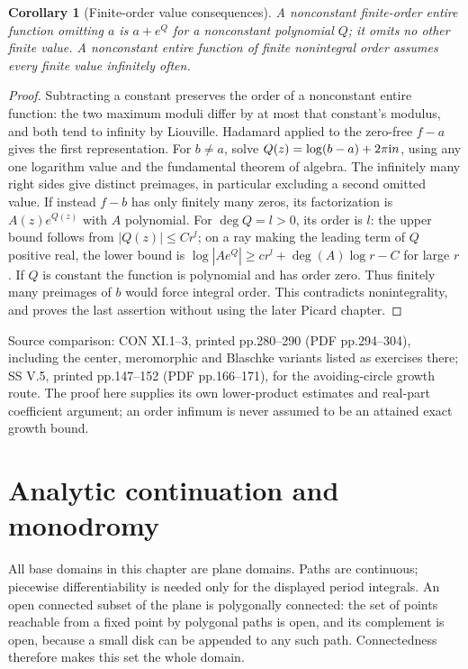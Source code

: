 \documentclass[11pt,a4paper,openany]{book}
\newtheorem{corollary}[theorem]{Corollary}
\theoremstyle{definition}
\theoremstyle{remark}\newtheorem{remark}[theorem]{Remark}
\newcommand{\family}[1]{}
\newcommand{\source}[1]{\par\begingroup\small\sffamily\color{black!65}Source comparison: #1\par\endgroup}
\begin{document}
\begin{corollary}[Finite-order value consequences]\label{d12:17-07}\family{D12.17.07}
A nonconstant finite-order entire function omitting $a$ is
$a+e^{Q}$ for a nonconstant polynomial $Q$; it omits no other finite
value. A nonconstant entire function of finite nonintegral order assumes
every finite value infinitely often.
\end{corollary}
\begin{proof}
Subtracting a constant preserves the order of a nonconstant entire
function: the two maximum moduli differ by at most that constant's
modulus, and both tend to infinity by Liouville. Hadamard applied to
the zero-free $f-a$ gives the first representation. For $b\ne a$, solve
$Q(z)=\log(b-a)+2\pi\mathrm i n$, using any one logarithm value and the
fundamental theorem of algebra. The infinitely many right sides give
distinct preimages, in particular excluding a second omitted value.
If instead $f-b$ has only finitely many zeros, its factorization is
$A(z)e^{Q(z)}$ with $A$ polynomial. For $\deg Q=l>0$, its order is
$l$: the upper bound follows from $|Q(z)|\le Cr^l$; on a ray making
the leading term of $Q$ positive real, the lower bound is
$\log|Ae^Q|\ge c r^l+\deg(A)\log r-C$ for large $r$.
If $Q$ is constant the function is polynomial and has order zero.
Thus finitely many preimages of $b$ would force integral order. This
contradicts nonintegrality, and proves the last assertion without using
the later Picard chapter.
\end{proof}
\source{CON XI.1--3, printed pp.280--290 (PDF pp.294--304), including
the center, meromorphic and Blaschke variants listed as exercises there;
SS V.5, printed pp.147--152 (PDF pp.166--171), for the avoiding-circle
growth route. The proof here supplies its own lower-product estimates
and real-part coefficient argument; an order infimum is never assumed
to be an attained exact growth bound.}


\chapter{Analytic continuation and monodromy}\label{ch:d12-19}

All base domains in this chapter are plane domains. Paths are continuous;
piecewise differentiability is needed only for the displayed period integrals.
An open connected subset of the plane is polygonally connected: the set of
points reachable from a fixed point by polygonal paths is open, and its
complement is open, because a small disk can be appended to any such path.
Connectedness therefore makes this set the whole domain.
\end{document}
